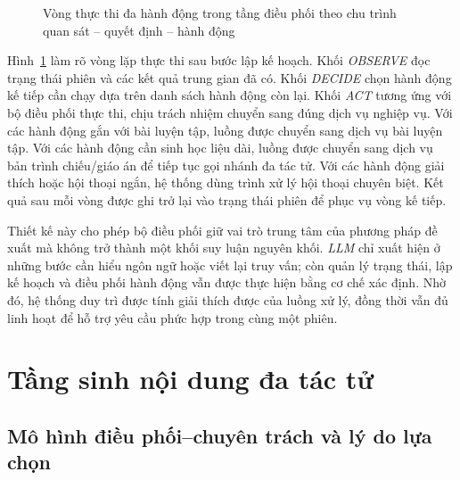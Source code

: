 \documentclass[../DoAn.tex]{subfiles}
\begin{document}
\begin{figure}[!htbp]
{
    }
    \caption{Vòng thực thi đa hành động trong tầng điều phối theo chu trình quan sát -- quyết định -- hành động}
    \label{fig:method-execution-loop}
\end{figure}

Hình~\ref{fig:method-execution-loop} làm rõ vòng lặp thực thi sau bước lập kế hoạch. Khối \textit{OBSERVE} đọc trạng thái phiên và các kết quả trung gian đã có. Khối \textit{DECIDE} chọn hành động kế tiếp cần chạy dựa trên danh sách hành động còn lại. Khối \textit{ACT} tương ứng với bộ điều phối thực thi, chịu trách nhiệm chuyển sang đúng dịch vụ nghiệp vụ. Với các hành động gắn với bài luyện tập, luồng được chuyển sang dịch vụ bài luyện tập. Với các hành động cần sinh học liệu dài, luồng được chuyển sang dịch vụ bản trình chiếu/giáo án để tiếp tục gọi nhánh đa tác tử. Với các hành động giải thích hoặc hội thoại ngắn, hệ thống dùng trình xử lý hội thoại chuyên biệt. Kết quả sau mỗi vòng được ghi trở lại vào trạng thái phiên để phục vụ vòng kế tiếp.

Thiết kế này cho phép bộ điều phối giữ vai trò trung tâm của phương pháp đề xuất mà không trở thành một khối suy luận nguyên khối. \textit{LLM} chỉ xuất hiện ở những bước cần hiểu ngôn ngữ hoặc viết lại truy vấn; còn quản lý trạng thái, lập kế hoạch và điều phối hành động vẫn được thực hiện bằng cơ chế xác định. Nhờ đó, hệ thống duy trì được tính giải thích được của luồng xử lý, đồng thời vẫn đủ linh hoạt để hỗ trợ yêu cầu phức hợp trong cùng một phiên.

\section{Tầng sinh nội dung đa tác tử}

\subsection{Mô hình điều phối--chuyên trách và lý do lựa chọn}
\end{document}
